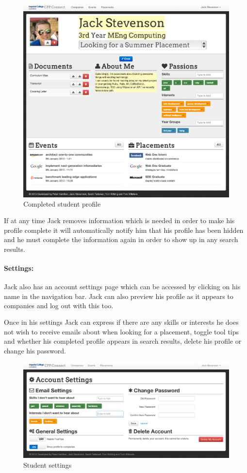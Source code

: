     \begin{figure}[H]\centering
    \includegraphics[scale=0.3]{images/user_experiences/student/jack_profile_complete}
    \caption{Completed student profile}
    \end{figure}

    If at any time Jack removes information which is needed in order to make his profile complete it will automatically notify him that his profile has been hidden and he must complete the information again in order to show up in any search results.

  \paragraph{Settings:}
    Jack also has an account settings page which can be accessed by clicking on his name in the navigation bar. Jack can also preview his profile as it appears to companies and log out with this too. 

    Once in his settings Jack can express if there are any skills or interests he does not wish to receive emails about when looking for a placement, toggle tool tips and whether his completed profile appears in search results, delete his profile or change his password.

    \begin{figure}[H]\centering
    \includegraphics[scale=0.3]{images/user_experiences/student/account_settings}
    \caption{Student settings}
    \end{figure}

